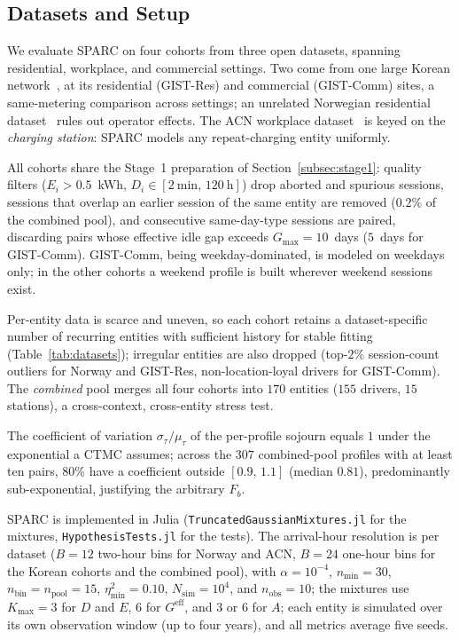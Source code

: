 \documentclass[journal]{IEEEtran}
\begin{document}
\subsection{Datasets and Setup}
\label{subsec:dataset}


We evaluate SPARC on four cohorts from three open datasets, spanning residential, workplace, and commercial settings. Two come from one large Korean network~\cite{baek2024dataset}, at its residential (GIST-Res) and commercial (GIST-Comm) sites, a same-metering comparison across settings; an unrelated Norwegian residential dataset~\cite{sorensen2024} rules out operator effects. The ACN workplace dataset~\cite{lee2019acndata} is keyed on the \emph{charging station}: SPARC models any repeat-charging entity uniformly.

All cohorts share the Stage~1 preparation of Section~\ref{subsec:stage1}: quality filters ($E_i > 0.5$~kWh, $D_i \in [2~\text{min},\, 120~\text{h}]$) drop aborted and spurious sessions, sessions that overlap an earlier session of the same entity are removed ($0.2\%$ of the combined pool), and consecutive same-day-type sessions are paired, discarding pairs whose effective idle gap exceeds $G_{\max} = 10$~days ($5$~days for GIST-Comm). GIST-Comm, being weekday-dominated, is modeled on weekdays only; in the other cohorts a weekend profile is built wherever weekend sessions exist.

Per-entity data is scarce and uneven, so each cohort retains a dataset-specific number of recurring entities with sufficient history for stable fitting (Table~\ref{tab:datasets}); irregular entities are also dropped (top-$2\%$ session-count outliers for Norway and GIST-Res, non-location-loyal drivers for GIST-Comm). The \emph{combined} pool merges all four cohorts into $170$ entities ($155$ drivers, $15$ stations), a cross-context, cross-entity stress test.

The coefficient of variation $\sigma_{\tau}/\mu_{\tau}$ of the per-profile sojourn equals $1$ under the exponential a CTMC assumes; across the $307$ combined-pool profiles with at least ten pairs, $80\%$ have a coefficient outside $[0.9,\, 1.1]$ (median $0.81$), predominantly sub-exponential, justifying the arbitrary $F_b$.

SPARC is implemented in Julia (\texttt{TruncatedGaussianMixtures.jl} for the mixtures, \texttt{HypothesisTests.jl} for the tests). The arrival-hour resolution is per dataset ($B = 12$ two-hour bins for Norway and ACN, $B = 24$ one-hour bins for the Korean cohorts and the combined pool), with $\alpha = 10^{-4}$, $n_{\min} = 30$, $n_{\mathrm{bin}} = n_{\mathrm{pool}} = 15$, $\eta^2_{\min} = 0.10$, $N_{\mathrm{sim}} = 10^4$, and $n_{\mathrm{obs}} = 10$; the mixtures use $K_{\max} = 3$ for $D$ and $E$, $6$ for $G^{\mathrm{eff}}$, and $3$ or $6$ for $A$; each entity is simulated over its own observation window (up to four years), and all metrics average five seeds.
\end{document}
